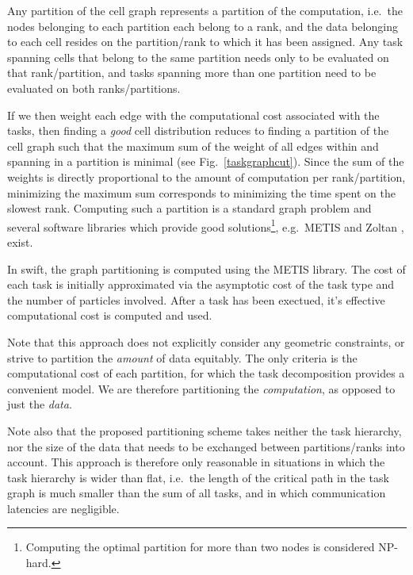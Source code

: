 \documentclass{sig-alternate-05-2015}
\newcommand{\swift}{{\sc swift}\xspace}
\begin{document}
Any partition of the cell graph represents a partition of the
computation, i.e.~the nodes belonging to each partition each belong
to a rank, and the
data belonging to each cell resides on the partition/rank to which
it has been assigned.
Any task spanning cells that belong to the same partition needs only
to be evaluated on that rank/partition, and tasks spanning more than
one partition need to be evaluated on both ranks/partitions.

If we then weight each edge with the computational cost associated with
the tasks, then finding a {\em good} cell distribution reduces to finding a
partition of the cell graph such that the maximum sum of the weight
of all edges within and spanning in a partition is minimal
(see Fig.~\ref{taskgraphcut}).
Since the sum of the weights is directly proportional to the amount
of computation per rank/partition, minimizing the maximum sum
corresponds to minimizing the time spent on the slowest rank.
Computing such a partition is a standard graph problem and several
software libraries which provide good solutions\footnote{Computing
the optimal partition for more than two nodes is considered NP-hard.},
e.g.~METIS \cite{ref:Karypis1998} and Zoltan \cite{devine2002zoltan}, exist.

In \swift, the graph partitioning is computed using the METIS library.
The cost of each task is initially approximated via the
asymptotic cost of the task type and the number of particles involved.
After a task has been exectued, it's effective computational cost
is computed and used.

Note that this approach does not explicitly consider any geometric
constraints, or strive to partition the {\em amount} of data equitably.
The only criteria is the computational cost of each partition, for
which the task decomposition provides a convenient model.
We are therefore partitioning the {\em computation}, as opposed
to just the {\em data}.

Note also that the proposed partitioning scheme takes neither the
task hierarchy, nor the size of the data that needs to be exchanged
between partitions/ranks into account.
This approach is therefore only reasonable in situations in which
the task hierarchy is wider than flat, i.e.~the length of the critical
path in the task graph is much smaller than the sum of all tasks,
and in which communication latencies are negligible.
\end{document}

